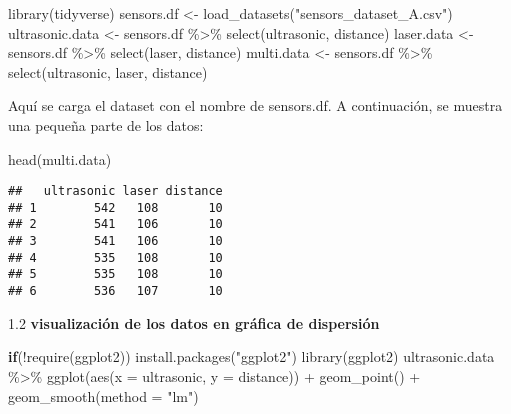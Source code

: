 \documentclass[
]{article}
\newenvironment{Shaded}{\begin{snugshade}}{\end{snugshade}}
\newcommand{\AttributeTok}[1]{\textcolor[rgb]{0.77,0.63,0.00}{#1}}
\newcommand{\ControlFlowTok}[1]{\textcolor[rgb]{0.13,0.29,0.53}{\textbf{#1}}}
\newcommand{\FunctionTok}[1]{\textcolor[rgb]{0.00,0.00,0.00}{#1}}
\newcommand{\NormalTok}[1]{#1}
\newcommand{\OtherTok}[1]{\textcolor[rgb]{0.56,0.35,0.01}{#1}}
\newcommand{\SpecialCharTok}[1]{\textcolor[rgb]{0.00,0.00,0.00}{#1}}
\newcommand{\StringTok}[1]{\textcolor[rgb]{0.31,0.60,0.02}{#1}}
\begin{document}
\begin{Shaded}
\begin{Highlighting}[]
\FunctionTok{library}\NormalTok{(tidyverse)}
\NormalTok{sensors.df }\OtherTok{\textless{}{-}} \FunctionTok{load\_datasets}\NormalTok{(}\StringTok{"sensors\_dataset\_A.csv"}\NormalTok{)}
\NormalTok{ultrasonic.data }\OtherTok{\textless{}{-}}\NormalTok{ sensors.df }\SpecialCharTok{\%\textgreater{}\%} \FunctionTok{select}\NormalTok{(ultrasonic, distance)}
\NormalTok{laser.data }\OtherTok{\textless{}{-}}\NormalTok{ sensors.df }\SpecialCharTok{\%\textgreater{}\%} \FunctionTok{select}\NormalTok{(laser, distance)}
\NormalTok{multi.data }\OtherTok{\textless{}{-}}\NormalTok{ sensors.df }\SpecialCharTok{\%\textgreater{}\%} \FunctionTok{select}\NormalTok{(ultrasonic, laser, distance)}
\end{Highlighting}
\end{Shaded}

Aquí se carga el dataset con el nombre de sensors.df. A continuación, se
muestra una pequeña parte de los datos:

\begin{Shaded}
\begin{Highlighting}[]
\FunctionTok{head}\NormalTok{(multi.data)}
\end{Highlighting}
\end{Shaded}

\begin{verbatim}
##   ultrasonic laser distance
## 1        542   108       10
## 2        541   106       10
## 3        541   106       10
## 4        535   108       10
## 5        535   108       10
## 6        536   107       10
\end{verbatim}

1.2 \textbf{visualización de los datos en gráfica de dispersión}

\begin{Shaded}
\begin{Highlighting}[]
\ControlFlowTok{if}\NormalTok{(}\SpecialCharTok{!}\FunctionTok{require}\NormalTok{(ggplot2))}
  \FunctionTok{install.packages}\NormalTok{(}\StringTok{"ggplot2"}\NormalTok{)}
\FunctionTok{library}\NormalTok{(ggplot2)}
\NormalTok{ultrasonic.data }\SpecialCharTok{\%\textgreater{}\%} 
    \FunctionTok{ggplot}\NormalTok{(}\FunctionTok{aes}\NormalTok{(}\AttributeTok{x =}\NormalTok{ ultrasonic, }\AttributeTok{y =}\NormalTok{ distance)) }\SpecialCharTok{+}
    \FunctionTok{geom\_point}\NormalTok{() }\SpecialCharTok{+}
    \FunctionTok{geom\_smooth}\NormalTok{(}\AttributeTok{method =} \StringTok{"lm"}\NormalTok{)}
\end{Highlighting}
\end{Shaded}
\end{document}
